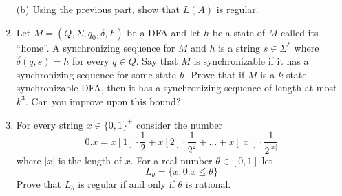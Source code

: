 \documentclass[twoside, 11pt]{article}
\begin{document}
\begin{enumerate}
		\item[(b)] Using the previous part, show that $L(A)$ is regular.
		
		\item Let $M = (Q, \Sigma, q_0, \delta, F)$ be a DFA and let $h$ be a state of $M$ called its ``home”. A synchronizing sequence for $M$ and $h$ is a string $s \in \Sigma^*$ where $\hat{\delta}(q, s) = h$ for
		every $q \in Q$. Say that $M$ is synchronizable if it has a synchronizing sequence for some state $h$. Prove that if $M$ is a $k$-state synchronizable DFA, then it has a synchronizing sequence of length at most $k^3$. Can you improve upon this bound?
		
		\item For every string $x \in \{0,1\}^+$ consider the number
		$$ 0.x = x[1] \cdot \frac{1}{2} + x[2] \cdot \frac{1}{2^2} +  \dots + x[|x|] \cdot \frac{1}{2^{|x|}}$$
		where $|x|$ is the length of $x$. For a real number $\theta \in [0,1]$ let 
		$$L_{\theta} = \{x : 0.x \leq \theta\}$$
		Prove that $L_{\theta}$ is regular if and only if $\theta$ is rational.
	\end{enumerate}
	
	
\end{document}
